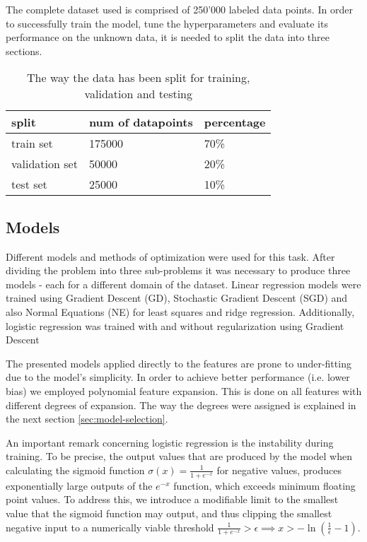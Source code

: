 \documentclass[10pt,conference,compsocconf]{IEEEtran}
\begin{document}
The complete dataset used is comprised of 250'000 labeled data points. In order to successfully train the model, tune the hyperparameters and evaluate its performance on the unknown data, it is needed to split the data into three sections. 

\begin{table}[htbp]
  \centering
    \begin{tabular}{lll}
    split & num of datapoints & percentage\\ \hline
    train set & 175000 & 70\%\\ \hline
    validation set & 50000 & 20\%\\ \hline
    test set & 25000 & 10\%\\ \hline
    \end{tabular}
  \caption{The way the data has been split for training, validation and testing}
  \label{tab:data-split}
\end{table}

\subsection{Models}

Different models and methods of optimization were used for this task. After dividing the problem into three sub-problems it was necessary to produce three models - each for a different domain of the dataset. Linear regression models were trained using Gradient Descent (GD), Stochastic Gradient Descent (SGD) and also Normal Equations (NE) for least squares and ridge regression. Additionally, logistic regression was trained with and without regularization using Gradient Descent

The presented models applied directly to the features are prone to under-fitting due to the model's simplicity. In order to achieve better performance (i.e. lower bias) we employed polynomial feature expansion. This is done on all features with different degrees of expansion. The way the degrees were assigned is explained in the next section \ref{sec:model-selection}. 

An important remark concerning logistic regression is the instability during training. To be precise, the output values that are produced by the model when calculating the sigmoid function $\sigma(x)=\frac{1}{1 + e^{-x}}$ for negative values, produces exponentially large outputs of the $e^{-x}$ function, which exceeds minimum floating point values. To address this, we introduce a modifiable limit to the smallest value that the sigmoid function may output, and thus clipping the smallest negative input to a numerically viable threshold $\frac{1}{1 + e^{-x}} > \epsilon \implies x > -\ln(\frac{1}{\epsilon} - 1)$.
\end{document}
